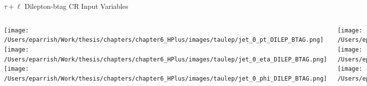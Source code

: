 \documentclass[aspectratio=169,xcolor=table]{beamer}
\begin{document}
    \begin{frame}[t]{$\tau+\ell$ Dilepton-btag CR Input Variables}
      \begin{columns}[t]
          \texttt{[image: /Users/eparrish/Work/thesis/chapters/chapter6\_HPlus/images/taulep/jet\_0\_pt\_DILEP\_BTAG.png]}
          \texttt{[image: /Users/eparrish/Work/thesis/chapters/chapter6\_HPlus/images/taulep/jet\_0\_eta\_DILEP\_BTAG.png]}
          \texttt{[image: /Users/eparrish/Work/thesis/chapters/chapter6\_HPlus/images/taulep/jet\_0\_phi\_DILEP\_BTAG.png]}

          \texttt{[image: /Users/eparrish/Work/thesis/chapters/chapter6\_HPlus/images/taulep/lep\_0\_pt\_DILEP\_BTAG.png]}
          \texttt{[image: /Users/eparrish/Work/thesis/chapters/chapter6\_HPlus/images/taulep/lep\_0\_eta\_DILEP\_BTAG.png]}
          \texttt{[image: /Users/eparrish/Work/thesis/chapters/chapter6\_HPlus/images/taulep/lep\_0\_phi\_DILEP\_BTAG.png]}

          \texttt{[image: /Users/eparrish/Work/thesis/chapters/chapter6\_HPlus/images/taulep/el\_0\_pt\_DILEP\_BTAG.png]}
          \texttt{[image: /Users/eparrish/Work/thesis/chapters/chapter6\_HPlus/images/taulep/el\_0\_eta\_DILEP\_BTAG.png]}
          \texttt{[image: /Users/eparrish/Work/thesis/chapters/chapter6\_HPlus/images/taulep/el\_0\_phi\_DILEP\_BTAG.png]}

          \texttt{[image: /Users/eparrish/Work/thesis/chapters/chapter6\_HPlus/images/taulep/mu\_0\_pt\_DILEP\_BTAG.png]}
          \texttt{[image: /Users/eparrish/Work/thesis/chapters/chapter6\_HPlus/images/taulep/mu\_0\_eta\_DILEP\_BTAG.png]}
          \texttt{[image: /Users/eparrish/Work/thesis/chapters/chapter6\_HPlus/images/taulep/mu\_0\_phi\_DILEP\_BTAG.png]}

      \end{columns}
      \end{frame}
\end{document}
